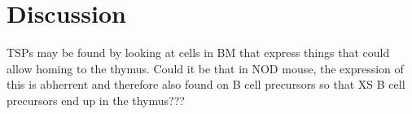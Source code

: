 
\chapter{Discussion}

TSPs may be found by looking at cells in BM that express things that could allow homing to the thymus. Could it be that in NOD mouse, the expression of this is abherrent and therefore also found on B cell precursors so that XS B cell precursors end up in the thymus???




